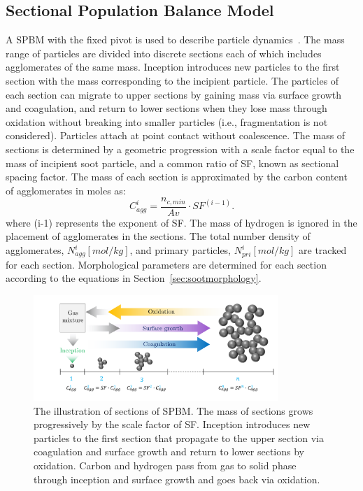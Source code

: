 \subsection{Sectional Population Balance Model}
A SPBM with the fixed pivot is used to describe particle dynamics~\citep{wu1988discrete}. The mass range of particles are divided into discrete sections each of which includes agglomerates of the same mass. Inception introduces new particles to the first section with the mass corresponding to the incipient particle. The particles of each section can migrate to upper sections by gaining mass via surface growth and coagulation, and return to lower sections when they lose mass through oxidation without breaking into smaller particles (i.e., fragmentation is not considered). Particles attach at point contact without coalescence. The mass of sections is determined by a geometric progression with a scale factor equal to the mass of incipient soot particle, and a common ratio of SF, known as sectional spacing factor. The mass of each section is approximated by the carbon content of agglomerates in moles as:
\begin{equation}
	C^i_{agg} = \frac{n_{c,min}}{Av}\cdot SF^{(i-1)}
	\label{eqn:Caggsec}.
\end{equation}
\noindent where (i-1) represents the exponent of SF. The mass of hydrogen is ignored in the placement of agglomerates in the sections.
The total number density of agglomerates, ${N^i_{agg} [mol/kg]}$, and primary particles, ${N^i_{pri} [mol/kg]}$ are tracked for each section. Morphological parameters are determined for each section according to the equations in Section~\ref{sec:sootmorphology}.

\begin{figure}[!htbp]
	\centering
	\includegraphics[height=40mm, ]{Figures/Theory/Sectional.pdf}
	\caption{The illustration of sections of SPBM. The mass of sections grows progressively by the scale factor of SF. Inception introduces new particles to the first section that propagate to the upper section via coagulation and surface growth and return to lower sections by oxidation. Carbon and hydrogen pass from gas to solid phase through inception and surface growth and goes back via oxidation.}
	\label{fig:sectional}
\end{figure}
 
